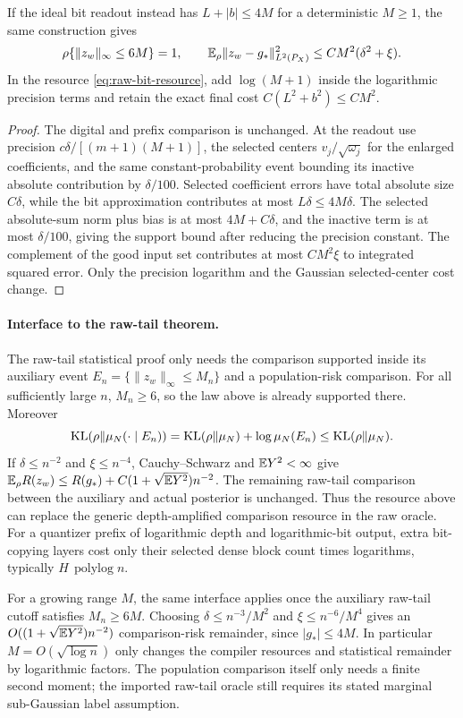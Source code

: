 \begin{corollary}
\label{cor:raw-bit-range}
If the ideal bit readout instead has $L+|b|\le4M$ for a deterministic
$M\ge1$, the same construction gives
\[
 \rho\{\|z_w\|_\infty\le6M\}=1,\qquad
 \mathbb E_\rho\|z_w-g_*\|_{L^2(P_X)}^2
       \le C M^2(\delta^2+\xi).
\]
In the resource \eqref{eq:raw-bit-resource}, add $\log(M+1)$ inside
the logarithmic precision terms and retain the exact final cost
$C(L^2+b^2)\le C M^2$.
\end{corollary}
\begin{proof}
The digital and prefix comparison is unchanged. At the readout use
precision $c\delta/[(m+1)(M+1)]$, the selected centers
$v_j/\sqrt{\omega_j}$ for the enlarged coefficients, and the same
constant-probability event bounding its inactive absolute contribution
by $\delta/100$. Selected coefficient errors have total absolute
size $C\delta$, while the bit approximation contributes at most
$L\delta\le4M\delta$. The selected absolute-sum norm plus bias is
at most $4M+C\delta$, and the inactive term is at most $\delta/100$,
giving the support bound after reducing the precision constant.
The complement of the good input set contributes at most $CM^2\xi$
to integrated squared error. Only the precision logarithm and the
Gaussian selected-center cost change.
\end{proof}

\paragraph{Interface to the raw-tail theorem.}
The raw-tail statistical proof only needs the comparison supported
inside its auxiliary event
$E_n=\{\|z_w\|_\infty\le M_n\}$ and a population-risk comparison.
For all sufficiently large $n$, $M_n\ge6$, so the law above is already
supported there. Moreover
\[
 \operatorname{KL}(\rho\Vert\mu_N(\cdot\mid E_n))
   =\operatorname{KL}(\rho\Vert\mu_N)+\log\mu_N(E_n)
   \le\operatorname{KL}(\rho\Vert\mu_N).
\]
If $\delta\le n^{-2}$ and $\xi\le n^{-4}$, Cauchy--Schwarz and
$\mathbb E Y^2<\infty$ give
$\mathbb E_\rho R(z_w)\le R(g_*)+C(1+\sqrt{\mathbb E Y^2})n^{-2}$.
The remaining raw-tail comparison between the auxiliary and actual
posterior is unchanged. Thus the resource above can replace the
generic depth-amplified comparison resource in the raw oracle.
For a quantizer prefix of logarithmic depth and logarithmic-bit
output, extra bit-copying layers cost only their selected dense
block count times logarithms, typically $H\,\operatorname{polylog}n$.

For a growing range $M$, the same interface applies once the auxiliary
raw-tail cutoff satisfies $M_n\ge6M$. Choosing
$\delta\le n^{-3}/M^2$ and $\xi\le n^{-6}/M^4$ gives an
$O((1+\sqrt{\mathbb E Y^2})n^{-2})$ comparison-risk remainder, since
$|g_*|\le4M$. In particular $M=O(\sqrt{\log n})$ only changes the
compiler resources and statistical remainder by logarithmic factors.
The population comparison itself only needs a finite second moment;
the imported raw-tail oracle still requires its stated marginal
sub-Gaussian label assumption.

